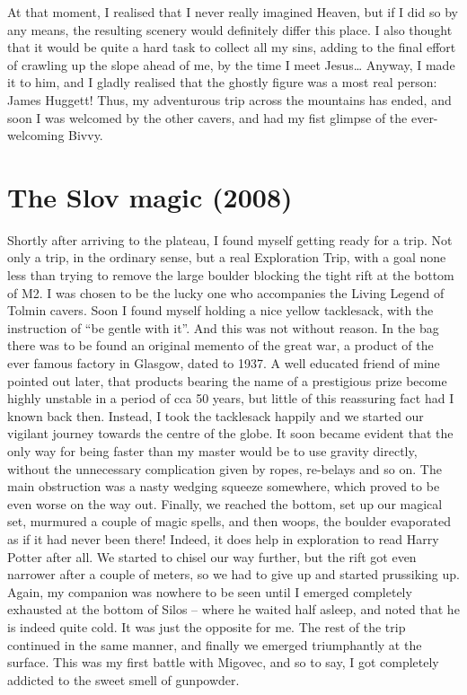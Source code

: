 At that moment, I realised that I never really imagined Heaven, but if I
did so by any means, the resulting scenery would definitely differ this
place. I also thought that it would be quite a hard task to collect all
my sins, adding to the final effort of crawling up the slope ahead of
me, by the time I meet Jesus\ldots{} Anyway, I made it to him, and I
gladly realised that the ghostly figure was a most real person: James
Huggett! Thus, my adventurous trip across the mountains has ended, and
soon I was welcomed by the other cavers, and had my fist glimpse of the
ever-welcoming Bivvy.


\section{The Slov magic (2008)}\label{the-slov-magic-2008}

Shortly after arriving to the plateau, I found myself getting ready for
a trip. Not only a trip, in the ordinary sense, but a real Exploration
Trip, with a goal none less than trying to remove the large boulder
blocking the tight rift at the bottom of M2. I was chosen to be the
lucky one who accompanies the Living Legend of Tolmin cavers. Soon I
found myself holding a nice yellow tacklesack, with the instruction of
``be gentle with it''. And this was not without reason. In the bag there
was to be found an original memento of the great war, a product of the
ever famous factory in Glasgow, dated to 1937. A well educated friend of
mine pointed out later, that products bearing the name of a prestigious
prize become highly unstable in a period of cca 50 years, but little of
this reassuring fact had I known back then. Instead, I took the
tacklesack happily and we started our vigilant journey towards the
centre of the globe. It soon became evident that the only way for being
faster than my master would be to use gravity directly, without the
unnecessary complication given by ropes, re-belays and so on. The main
obstruction was a nasty wedging squeeze somewhere, which proved to be
even worse on the way out. Finally, we reached the bottom, set up our
magical set, murmured a couple of magic spells, and then woops, the
boulder evaporated as if it had never been there! Indeed, it does help
in exploration to read Harry Potter after all. We started to chisel our
way further, but the rift got even narrower after a couple of meters, so
we had to give up and started prussiking up. Again, my companion was
nowhere to be seen until I emerged completely exhausted at the bottom of
Silos -- where he waited half asleep, and noted that he is indeed quite
cold. It was just the opposite for me. The rest of the trip continued in
the same manner, and finally we emerged triumphantly at the surface.
This was my first battle with Migovec, and so to say, I got completely
addicted to the sweet smell of gunpowder.

